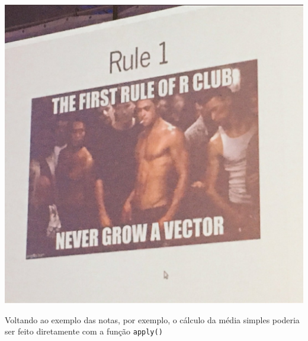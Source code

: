 \documentclass[
  10pt,
  a4paper]{book}
\begin{document}
\begin{center}\includegraphics[width=0.9\linewidth]{img/R_club} \end{center}

Voltando ao exemplo das notas, por exemplo, o cálculo da média simples
poderia ser feito diretamente com a função \texttt{apply()}
\end{document}
